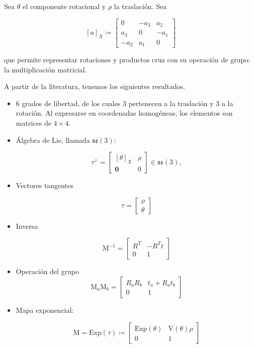 Sea $\theta$ el componente rotacional y $\rho$ la traslación. Sea

$$
[a]_X \coloneq 
\begin{bmatrix}
    0 & -a_3 & a_2 \\ a_3 & 0 & -a_1 \\ -a_2 & a_1 & 0
\end{bmatrix}
$$

\noindent que permite representar rotaciones y productos cruz con su operación de grupo: la multiplicación matricial.

A partir de la literatura, tenemos los siguientes resultados.

\begin{itemize}

\item
6 grados de libertad, de los cuales 3 pertenecen a la traslación y 3 a la rotación. Al expresarse en coordenadas homogéneas, los elementos son matrices de $4 \times 4$.

\item 
Álgebra de Lie, llamada $\mathfrak{se}(3)$:

$$
\tau^\wedge =
\begin{bmatrix}
[\theta]_X & \rho \\
\mathbf{0} & 0
\end{bmatrix}
\in \mathfrak{se}(3),
$$

\item 
Vectores tangentes

$$
\tau = 
\begin{bmatrix}
    \rho \\
    \theta
\end{bmatrix}
$$

\item 
Inversa

$$
\text{M}^{-1} =
\begin{bmatrix}
    R^T & -R^T t \\
    0 & 1
\end{bmatrix}
$$

\item 
Operación del grupo
$$
\text{M}_a \text{M}_b = 
\begin{bmatrix}
    R_a R_b & t_a + R_a t_b \\
    0 & 1
\end{bmatrix}
$$

\item 
Mapa exponencial:

$$
\text{M} = \text{Exp}(\tau) \coloneq
\begin{bmatrix}
    \text{Exp}(\theta) & \text{V}(\theta)\rho \\
    0 & 1
\end{bmatrix}
$$


\end{itemize}
